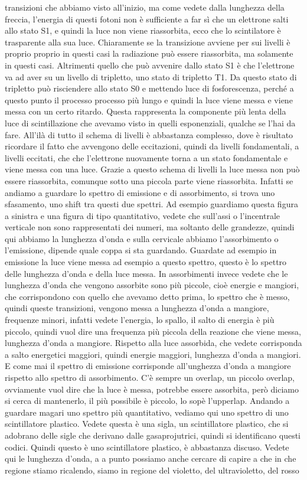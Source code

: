 transizioni che abbiamo visto all'inizio, ma come vedete dalla lunghezza della freccia, l'energia di questi fotoni non è sufficiente a far sì che un elettrone salti allo stato S1, e quindi la luce non viene riassorbita, ecco che lo scintilatore è trasparente alla sua luce. Chiaramente se la transizione avviene per sui livelli è proprio proprio in questi casi la radiazione può essere riassorbita, ma solamente in questi casi. Altrimenti quello che può avvenire dallo stato S1 è che l'elettrone va ad aver su un livello di tripletto, uno stato di tripletto T1. Da questo stato di tripletto può risciendere allo stato S0 e mettendo luce di fosforescenza, perché a questo punto il processo processo più lungo e quindi la luce viene messa e viene messa con un certo ritardo. Questa rappresenta la componente più lenta della luce di scintillazione che avevamo visto in quelli esponenziali, qualche se l'hai da fare. All'ilà di tutto il schema di livelli è abbastanza complesso, dove è risultato ricordare il fatto che avvengono delle eccitazioni, quindi da livelli fondamentali, a livelli eccitati, che che l'elettrone nuovamente torna a un stato fondamentale e viene messa con una luce. Grazie a questo schema di livelli la luce messa non può essere riassorbita, comunque sotto una piccola parte viene riassorbita. Infatti se andiamo a guardare lo spettro di emissione e di assorbimento, si trova uno sfasamento, uno shift tra questi due spettri. Ad esempio guardiamo questa figura a sinistra e una figura di tipo quantitativo, vedete che sull'assi o l'incentrale verticale non sono rappresentati dei numeri, ma soltanto delle grandezze, quindi qui abbiamo la lunghezza d'onda e sulla cervicale abbiamo l'assorbimento o l'emissione, dipende quale coppa si sta guardando. Guardate ad esempio in emissione la luce viene messa ad esempio a questo spettro, questo è lo spettro delle lunghezza d'onda e della luce messa. In assorbimenti invece vedete che le lunghezza d'onda che vengono assorbite sono più piccole, cioè energie e mangiori, che corrispondono con quello che avevamo detto prima, lo spettro che è messo, quindi queste transizioni, vengono messa a lunghezza d'onda a mangiore, frequenze minori, infatti vedete l'energia, lo spallo, il salto di energia è più piccolo, quindi vuol dire una frequenza più piccola della reazione che viene messa, lunghezza d'onda a mangiore. Rispetto alla luce assorbida, che vedete corrisponda a salto energetici maggiori, quindi energie maggiori, lunghezza d'onda a mangiori. E come mai il spettro di emissione corrisponde all'unghezza d'onda a mangiore rispetto allo spettro di assorbimento. C'è sempre un overlap, un piccolo overlap, ovviamente vuol dire che la luce è messa, potrebbe essere assorbita, però diciamo si cerca di mantenerlo, il più possibile è piccolo, lo sopè l'upperlap. Andando a guardare magari uno spettro più quantitativo, vediamo qui uno spettro di uno scintillatore plastico. Vedete questa è una sigla, un scintillatore plastico, che si adobrano delle sigle che derivano dalle gasaprojutrici, quindi si identificano questi codici. Quindi questo è uno scintillatore plastico, è abbastanza discuso. Vedete qui le lunghezza d'onda, a a punto possiamo anche cercare di capire a che in che regione stiamo ricalendo, siamo in regione del violetto, del ultravioletto, del rosso 